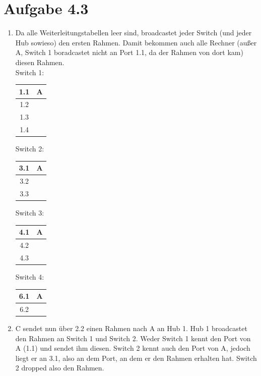 \documentclass[12pt, a4paper]{article}
\begin{document}
\section*{Aufgabe 4.3}
\begin{enumerate}[label=\arabic*.]
	\item	Da alle Weiterleitungstabellen leer sind, broadcastet jeder Switch (und jeder Hub sowieso) den ersten Rahmen. Damit bekommen auch alle Rechner (außer A, Switch 1 boradcastet nicht an Port 1.1, da der Rahmen von dort kam) diesen Rahmen.\\
			
			Switch 1:
			\begin{center}
				\begin{tabular}{c|c}
					1.1 & A \\
					\hline
					1.2 \\
					\hline
					1.3 \\
					\hline
					1.4 \\
				\end{tabular}
			\end{center}
			
			Switch 2:
			\begin{center}
				\begin{tabular}{c|c}
					3.1 & A \\
					\hline
					3.2 \\
					\hline
					3.3 \\
				\end{tabular}
			\end{center}
			
			Switch 3:
			\begin{center}
				\begin{tabular}{c|c}
					4.1 & A \\
					\hline
					4.2 \\
					\hline
					4.3 \\
				\end{tabular}
			\end{center}
			
			Switch 4:
			\begin{center}
				\begin{tabular}{c|c}
					6.1 & A \\
					\hline
					6.2 \\
				\end{tabular}
			\end{center}
	
	\item	C sendet nun über 2.2 einen Rahmen nach A an Hub 1. Hub 1 broadcastet den Rahmen an Switch 1 und Switch 2. Weder Switch 1 kennt den Port von A (1.1) und sendet ihm diesen. Switch 2 kennt auch den Port von A, jedoch liegt er an 3.1, also an dem Port, an dem er den Rahmen erhalten hat. Switch 2 dropped also den Rahmen.\\
	

\end{enumerate}
\end{document}
